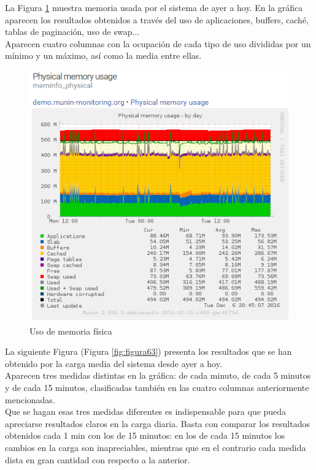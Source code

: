 \newpage

La Figura \ref{fig:figura62} muestra memoria usada por el sistema de ayer a hoy. En la gráfica aparecen los resultados obtenidos a través del uso de aplicaciones, buffers, caché, tablas de paginación, uso de swap...
\\

Aparecen cuatro columnas con la ocupación de cada tipo de uso divididas por un mínimo y un máximo, así como la media entre ellas.

\begin{figure}[H]
	\centering
	\includegraphics[scale=1]{figuras/ejercicio6/figura2.png} 
	\caption{Uso de memoria física \cite{enlace5}} 
	\label{fig:figura62}
\end{figure}

La siguiente Figura (Figura \ref{fig:figura63}) presenta los resultados que se han obtenido por la carga media del sistema desde ayer a hoy.
\\

Aparecen tres medidas distintas en la gráfica: de cada minuto, de cada 5 minutos y de cada 15 minutos, clasificadas también en las cuatro columnas anteriormente mencionadas.
\\

Que se hagan esas tres medidas diferentes es indispensable para que pueda apreciarse resultados claros en la carga diaria. Basta con comparar los resultados obtenidos cada 1 min con los de 15 minutos: en los de cada 15 minutos los cambios en la carga son inapreciables, mientras que en el contrario cada medida dista en gran cantidad con respecto a la anterior.

